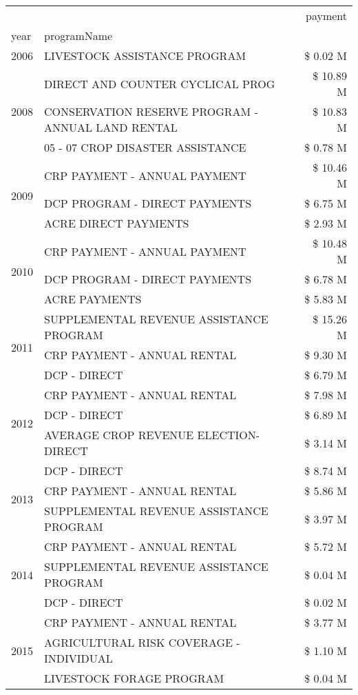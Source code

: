 \begin{tabular}{llr}
\toprule
 &  & payment \\
year & programName &  \\
\midrule
2006 & LIVESTOCK ASSISTANCE PROGRAM & \$ 0.02 M \\
\cline{1-3}
\multirow[t]{3}{*}{2008} & DIRECT AND COUNTER CYCLICAL PROG & \$ 10.89 M \\
 & CONSERVATION RESERVE PROGRAM - ANNUAL LAND RENTAL & \$ 10.83 M \\
 & 05 - 07 CROP DISASTER ASSISTANCE & \$ 0.78 M \\
\cline{1-3}
\multirow[t]{3}{*}{2009} & CRP PAYMENT - ANNUAL PAYMENT & \$ 10.46 M \\
 & DCP PROGRAM - DIRECT PAYMENTS & \$ 6.75 M \\
 & ACRE DIRECT PAYMENTS & \$ 2.93 M \\
\cline{1-3}
\multirow[t]{3}{*}{2010} & CRP PAYMENT - ANNUAL PAYMENT & \$ 10.48 M \\
 & DCP PROGRAM - DIRECT PAYMENTS & \$ 6.78 M \\
 & ACRE PAYMENTS & \$ 5.83 M \\
\cline{1-3}
\multirow[t]{3}{*}{2011} & SUPPLEMENTAL REVENUE ASSISTANCE PROGRAM & \$ 15.26 M \\
 & CRP PAYMENT - ANNUAL RENTAL & \$ 9.30 M \\
 & DCP - DIRECT & \$ 6.79 M \\
\cline{1-3}
\multirow[t]{3}{*}{2012} & CRP PAYMENT - ANNUAL RENTAL & \$ 7.98 M \\
 & DCP - DIRECT & \$ 6.89 M \\
 & AVERAGE CROP REVENUE ELECTION-DIRECT & \$ 3.14 M \\
\cline{1-3}
\multirow[t]{3}{*}{2013} & DCP - DIRECT & \$ 8.74 M \\
 & CRP PAYMENT - ANNUAL RENTAL & \$ 5.86 M \\
 & SUPPLEMENTAL REVENUE ASSISTANCE PROGRAM & \$ 3.97 M \\
\cline{1-3}
\multirow[t]{3}{*}{2014} & CRP PAYMENT - ANNUAL RENTAL & \$ 5.72 M \\
 & SUPPLEMENTAL REVENUE ASSISTANCE PROGRAM & \$ 0.04 M \\
 & DCP - DIRECT & \$ 0.02 M \\
\cline{1-3}
\multirow[t]{3}{*}{2015} & CRP PAYMENT - ANNUAL RENTAL & \$ 3.77 M \\
 & AGRICULTURAL RISK COVERAGE - INDIVIDUAL & \$ 1.10 M \\
 & LIVESTOCK FORAGE PROGRAM & \$ 0.04 M \\

\end{tabular}
